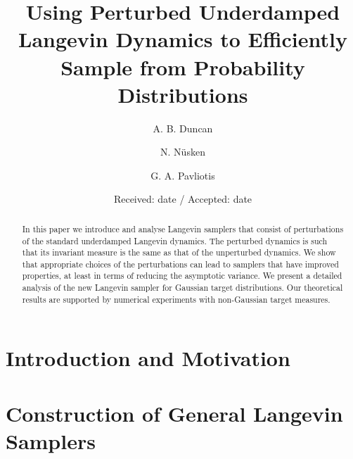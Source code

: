 \documentclass[onecollarge]{svjour2}       %
\begin{document}
\title{Using Perturbed Underdamped Langevin Dynamics to Efficiently Sample
from Probability Distributions}


\author{A. B. Duncan         \and
        N. N{\"u}sken \and  
        G. A. Pavliotis
}


\begingroup
{}

\date{Received: date / Accepted: date}


\maketitle
\begin{abstract}
In this paper we introduce and analyse Langevin samplers that consist of perturbations of the standard underdamped Langevin dynamics. The perturbed dynamics is such that its invariant measure is the same as that of the unperturbed dynamics. We show that appropriate choices of the perturbations can lead to samplers that have improved properties, at least in terms of reducing the asymptotic variance. We present a detailed analysis of the new Langevin sampler for Gaussian target distributions. Our theoretical results are supported by numerical experiments with non-Gaussian target measures.
\end{abstract}


\section{Introduction and Motivation}
\label{sec:introduction}


\section{Construction of General Langevin Samplers}
\label{sec:background}

\end{document}

